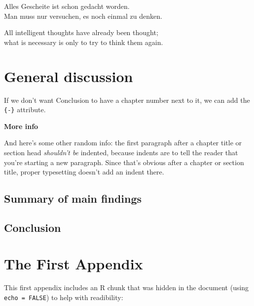\documentclass[a4paper, twoside]{templates/ociamthesis}
\begin{document}
\clearpage

\begin{savequote}
Alles Gescheite ist schon gedacht worden.\\
Man muss nur versuchen, es noch einmal zu denken.

All intelligent thoughts have already been thought;\\
what is necessary is only to try to think them again.
\end{savequote}



\hypertarget{general-discussion}{%
\chapter*{General discussion}\label{general-discussion}}

If we don't want Conclusion to have a chapter number next to it, we can add the \texttt{\{-\}} attribute.

\textbf{More info}

And here's some other random info: the first paragraph after a chapter title or section head \emph{shouldn't be} indented, because indents are to tell the reader that you're starting a new paragraph. Since that's obvious after a chapter or section title, proper typesetting doesn't add an indent there.

\hypertarget{summary-of-main-findings}{%
\section*{Summary of main findings}\label{summary-of-main-findings}}

\hypertarget{conclusion-3}{%
\section*{Conclusion}\label{conclusion-3}}

\startappendices

\hypertarget{the-first-appendix}{%
\chapter{The First Appendix}\label{the-first-appendix}}

This first appendix includes an R chunk that was hidden in the document (using \texttt{echo\ =\ FALSE}) to help with readibility:
\end{document}
